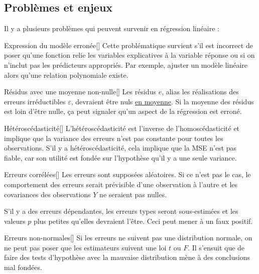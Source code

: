 \documentclass[french]{article}
\begin{document}
\begin{multicols*}{2}
\subsection{Problèmes et enjeux}\label{subsec:LMHProbIssues}
Il y a plusieurs problèmes qui peuvent survenir en régression linéaire :

\begin{definitionGENERAL}{Expression du modèle erronée}[]
Cette problématique survient s'il est incorrect de poser qu'une fonction relie les variables explicatives à la variable réponse ou si on n'inclut pas les prédicteurs appropriés. Par exemple, ajuster un modèle linéaire alors qu'une relation polynomiale existe.
\end{definitionGENERAL}

\begin{definitionGENERAL}{Résidus avec une moyenne non-nulle}[]
Les résidus $e$, alias les réalisations des erreurs irréductibles $\varepsilon$, devraient être nuls \underline{en moyenne}. Si la moyenne des résidus est loin d'être nulle, ça peut signaler qu'un aspect de la régression est erroné.
\end{definitionGENERAL}

\begin{definitionGENERAL}{Hétéroscédasticité}[]
L'hétéroscédasticité est l'inverse de l'homoscédasticité et implique que la variance des erreurs n'est pas constante pour toutes les observations. S'il y a hétéroscédasticité, cela implique que la MSE n'est pas fiable, car son utilité est fondée sur l'hypothèse qu'il y a une seule variance.
\end{definitionGENERAL}

\begin{definitionGENERAL}{Erreurs corrélées}[]
Les erreurs sont supposées aléatoires. Si ce n'est pas le cas, le comportement des erreurs serait prévisible d'une observation à l'autre et les covariances des observations $Y$ ne seraient pas nulles.

\bigskip

S'il y a des erreurs dépendantes, les erreurs types seront sous-estimées et les valeurs $p$ plus petites qu'elles devraient l'être. Ceci peut mener à un faux positif.
\end{definitionGENERAL}

\begin{definitionGENERAL}{Erreurs non-normales}[]
Si les erreurs ne suivent pas une distribution normale, on ne peut pas poser que les estimateurs suivent une loi $t$ ou $F$. Il s'ensuit que de faire des tests d'hypothèse avec la mauvaise distribution mène à des conclusions mal fondées.
\end{definitionGENERAL}


\end{multicols*}
\end{document}
